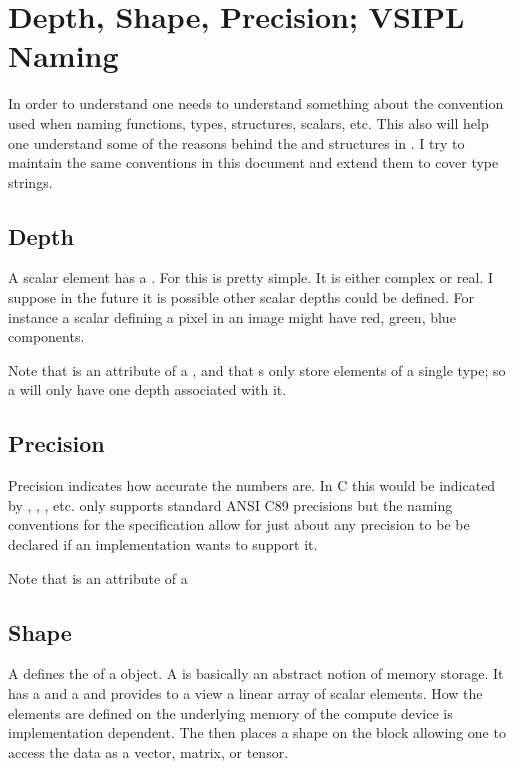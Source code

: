 \clearpage
\section*{Depth, Shape, Precision; VSIPL Naming}
In order to understand \cvl{} one needs to understand something about the convention used when naming functions, types, structures, scalars, etc. This also will help one understand some of the reasons behind the  and  structures in \cvl. I try to maintain the same conventions in this document and extend them to cover \pyjv{} type strings.
%
\subsection*{Depth}
A scalar element has a .  For  this is pretty simple.  It is either complex or real. I suppose in the future it is possible other scalar depths could be defined. For instance a scalar defining a pixel in an image might have red, green, blue components. 

Note that  is an attribute of a , and that s only store elements of a single type; so a  will only have one depth associated with it. 
%
\subsection*{Precision}
Precision indicates how accurate the numbers are. In C this would be indicated by , , , etc. \jv{} only supports standard ANSI C89 precisions but the naming conventions for the  specification allow for just about any precision to be be declared if an implementation wants to support it.

Note that  is an attribute of a 
%
\subsection*{Shape}
A  defines the  of a  object. A  is basically an abstract notion of memory storage. It has a  and a  and provides to a view a linear array of scalar elements.  How the elements are defined on the underlying memory of the compute device is implementation dependent. The  then places a shape on the block allowing one to access the data as a vector, matrix, or tensor. 

